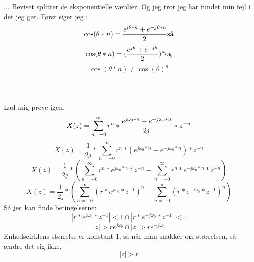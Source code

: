 \begin{Opgaver}
\begin{kapitel}
\begin{Opgave}
            ... 
            Beviset splitter de eksponentielle værdier. Og jeg tror jeg har fundet min fejl i det jeg gør.
            Først siger jeg :
            \[\cos(\theta*n) = \frac{e^{j\theta*n} + e^{-j\theta*n}}{2} \text{så}\]  
            \[\cos(\theta*n) = (\frac{e^{j\theta} + e^{-j\theta}}{2})^n \text{og}\]
            \[\cos(\theta*n) \neq \cos(\theta)^n\]
            \\\\\\
            Lad mig prøve igen.
            \[X(z) = \sum_{n=-0}^{\infty}{r^n * \frac{e^{j\omega_0 * n} - e^{-j\omega_0 * n}}{2j} * z^{-n}}\]
            \[X(z) = \frac{1}{2j} * \sum_{n=-0}^{\infty}{r^n * (e^{j\omega_0*n} - e^{-j\omega_0*n}) * z^{-n}}\]
            \[X(z) = \frac{1}{2j} * (\sum_{n=-0}^{\infty}{r^n * e^{j\omega_0*n} * z^{-n}} - \sum_{n=-0}^{\infty}{r^n * e^{-j\omega_0*n} * z^{-n}})\]
            \[X(z) = \frac{1}{2j} * (\sum_{n=-0}^{\infty}{(r * e^{j\omega_0} * z^{-1})^n} - \sum_{n=-0}^{\infty}{(r * e^{-j\omega_0} * z^{-1})^n})\]
            Så jeg kan finde betingelserne: 
            \[|r*e^{j\omega_0} * z^{-1}| < 1 \cap |r*e^{-j\omega_0}*z^{-1}| < 1\]
            \[|z| > re^{j\omega_0} \cap |z| > re^{-j\omega_0}\]
            Enhedscirklens størrelse er konstant 1, så når man snakker om størrelsen, så ændre det sig ikke. 
            \[|z| > r\]
            

\end{Opgave}
\end{kapitel}
\end{Opgaver}
